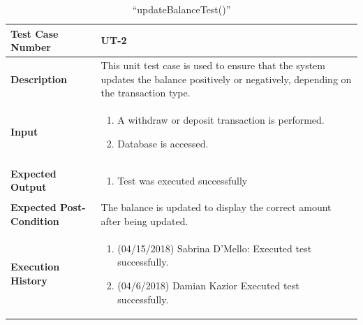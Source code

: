 \documentclass[12pt]{article}
\begin{document}
\begin{table}[H]
\caption{“updateBalanceTest()”}
\begin{center}
\begin{tabular}{|p{5.5cm}|p{11cm}|}
  \hline
  \bf Test Case Number & UT-2\\\hline
  \bf Description & 
  This unit test case is used to ensure that the system updates the balance positively or negatively, depending on the transaction type.\\\hline
  \bf Input &
  \begin{enumerate}
  \item A withdraw or deposit transaction is performed.
  \item Database is accessed.
  \end{enumerate}
  \\\hline
  \bf Expected Output &
  \begin{enumerate}
  \item Test was executed successfully
  \end{enumerate}
  \\\hline
  \bf Expected Post-Condition & 
  The balance is updated to display the correct amount after being updated.
  \\\hline   
  \bf Execution History & 
  \begin{enumerate}
  \item (04/15/2018) Sabrina D’Mello: Executed test successfully.
  \item (04/6/2018) Damian Kazior Executed test successfully.
  \end{enumerate}
  \\\hline
\end{tabular}
\end{center}
\end{table}
\end{document}
